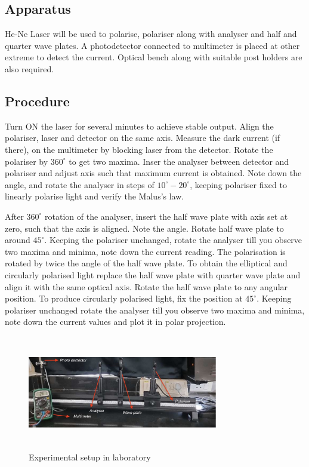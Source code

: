 \documentclass[a4paper, amsfonts, amssymb, amsmath, reprint, showkeys, nofootinbib, twoside]{revtex4-1}
\begin{document}
\subsection{Apparatus}
He-Ne Laser will be used to polarise, polariser along with analyser and half and quarter wave plates. A photodetector connected to multimeter is placed at other extreme to detect the current. Optical bench along with suitable post holders are also required.  
\subsection{Procedure}
Turn ON the laser for several minutes to achieve stable output. Align the polariser, laser and detector on the same axis. Measure the dark current (if there), on the multimeter by blocking laser from the detector. Rotate the polariser by $360^\circ$ to get two maxima. Inser the analyser between detector and polariser and adjust axis such that maximum current is obtained. Note down the angle, and rotate the analyser in steps of $10^\circ-20^\circ$, keeping polariser fixed to linearly polarise light and verify the Malus's law.

After $360^\circ$ rotation of the analyser, insert the half wave plate with axis set at zero, such that the axis is aligned. Note the angle. Rotate half wave plate to around $45^\circ$. Keeping the polariser unchanged, rotate the analyser till you observe two maxima and minima, note down the current reading. The polarisation is rotated by twice the angle of the half wave plate. To obtain the elliptical and circularly polarised light replace the half wave plate with quarter wave plate and align it with the same optical axis. Rotate the half wave plate to any angular position. To produce circularly polarised light, fix the position at $45^\circ$. Keeping polariser unchanged rotate the analyser till you observe two maxima and minima, note down the current values and plot it in polar projection. 

\begin{figure}[H] %
	\centering
	\includegraphics[width=8.3cm,height=5cm]{app} 
	\caption{Experimental setup in laboratory}
	\label{app}
\end{figure}
\end{document}
